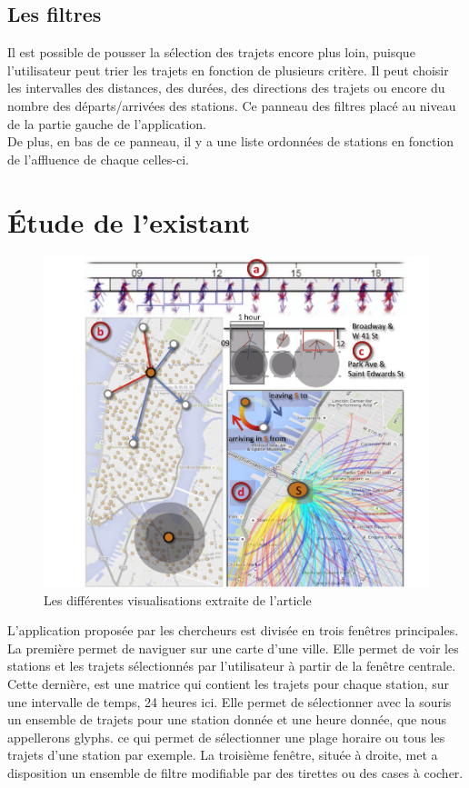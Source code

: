 \documentclass[12pt]{article}
\begin{document}
		\subsection{Les filtres}
		Il est possible de pousser la sélection des trajets encore plus loin, puisque l'utilisateur
		peut trier les trajets en fonction de plusieurs critère. Il peut choisir les intervalles
		des distances, des durées, des directions des trajets ou encore du nombre des
		départs/arrivées des stations. Ce panneau des filtres placé au niveau de la partie gauche
		de l'application.\\
		De plus, en bas de ce panneau, il y a une liste ordonnées de stations en fonction
		de l'affluence de chaque celles-ci.
	
\newpage
	\section{Étude de l’existant}	
	\begin{figure}[!h]
	\begin{center}
	\includegraphics[scale=.3]{screenshot_article.png}
	\caption{Les différentes visualisations extraite de l'article \cite{Oli16}}
	\end{center}
	\end{figure}
	
	L’application proposée par les chercheurs est divisée en trois fenêtres principales.
	La première permet de naviguer sur une carte d’une ville. Elle permet de voir les
	stations et les trajets sélectionnés par l’utilisateur à partir de la fenêtre centrale.
	Cette dernière, est une matrice qui contient les trajets pour chaque station, sur une
	intervalle de temps, 24 heures ici. Elle permet de sélectionner avec la souris un
	ensemble de trajets pour une station donnée et une heure donnée, que nous appellerons glyphs.
	ce qui permet de sélectionner une plage horaire ou tous les trajets d'une station par exemple.
	La troisième fenêtre, située à droite, met a disposition un ensemble de filtre modifiable
	par des tirettes ou des cases à cocher. \\
	
\end{document}
